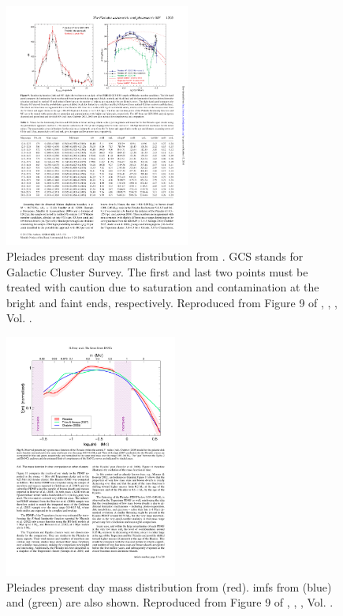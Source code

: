 \begin{figure}[ht!]
\begin{center}
\includegraphics[height=8cm]{background/Figures/F9b_Lodieu2012.pdf}
\caption{Pleiades present day mass distribution from \citet{Lodieu2012}. GCS stands for Galactic Cluster Survey. The first and last two points must be treated with caution due to saturation and contamination at the bright and faint ends, respectively. Reproduced from Figure 9 of \citet{Lodieu2012}, \textit{}, , Vol. .}
\label{fig:massLodieu}
\end{center}
\end{figure}

\begin{figure}[ht!]
\begin{center}
\includegraphics[height=8cm]{background/Figures/F9_Bouy2015.pdf}
\caption{Pleiades present day mass distribution  from \citet{Bouy2015} (red). \glspl{imf} from \citet{Chabrier2005}(blue) and \citet{Thies2007} (green) are also shown. Reproduced from Figure 9 of \citet{Bouy2015}, \textit{}, , Vol. .}
\label{fig:massBouy}
\end{center}
\end{figure}


